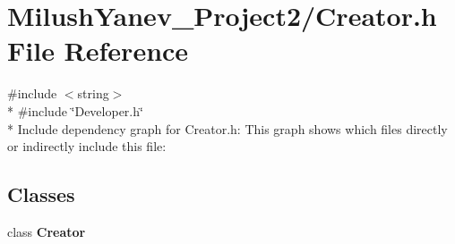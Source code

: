 \section{Milush\+Yanev\+\_\+\+Project2/\+Creator.h File Reference}
\label{_creator_8h}
{\ttfamily \#include $<$string$>$}\\*
{\ttfamily \#include \char`\"{}Developer.\+h\char`\"{}}\\*
Include dependency graph for Creator.\+h\+:
This graph shows which files directly or indirectly include this file\+:
\subsection*{Classes}
\begin{DoxyCompactItemize}
\item 
class {\bf Creator}
\end{DoxyCompactItemize}

